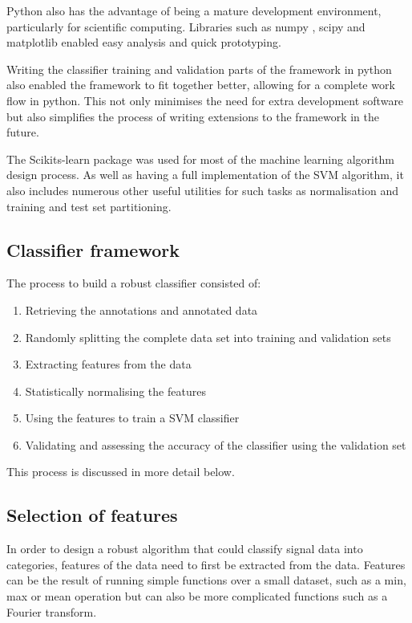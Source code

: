 Python also has the advantage of being a mature development environment, particularly for scientific computing. Libraries such as numpy \cite{numpy}, scipy \cite{scipy} and matplotlib \cite{matplotlib} enabled easy analysis and quick prototyping. 

Writing the classifier training and validation parts of the framework in python also enabled the framework to fit together better, allowing for a complete work flow in python. This not only minimises the need for extra development software but also simplifies the process of writing extensions to the framework in the future. 

The Scikits-learn package was used for most of the machine learning algorithm design process. As well as having a full implementation of the SVM algorithm, it also includes numerous other useful utilities for such tasks as normalisation and training and test set partitioning. 

\subsection{Classifier framework}
\label{classifierframework}

The process to build a robust classifier consisted of:

\begin{enumerate}
\item Retrieving the annotations and annotated data

\item Randomly splitting the complete data set into training and validation sets

\item Extracting features from the data

\item Statistically normalising the features

\item Using the features to train a SVM classifier

\item Validating and assessing the accuracy of the classifier using the validation set
\end{enumerate}

This process is discussed in more detail below. 

\subsection{Selection of features}
In order to design a robust algorithm that could classify signal data into categories, features of the data need to first be extracted from the data. Features can be the result of running simple functions over a small dataset, such as a min, max or mean operation but can also be more complicated functions such as a Fourier transform. 

